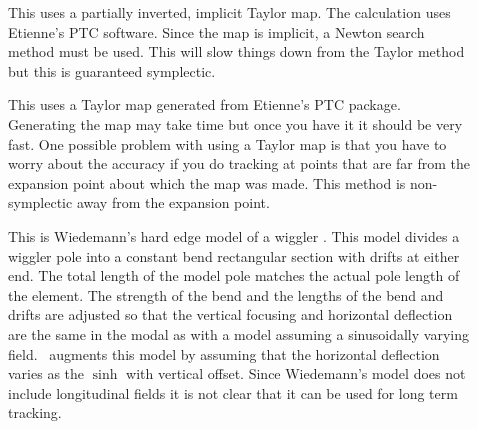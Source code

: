 \begin{description}
\item[]
This uses a partially inverted, implicit Taylor map. The calculation
uses Etienne's PTC software.  Since the map is implicit, a Newton
search method must be used. This will slow things down from the Taylor
method but this is guaranteed symplectic.

\item[]
This uses a Taylor map generated from Etienne's PTC
package. Generating the map may take time but once you have it it
should be very fast. One possible problem with using a Taylor map is
that you have to worry about the accuracy if you do tracking at points
that are far from the expansion point about which the map was
made. This method is non-symplectic away from the expansion point. 

\item[]
This is Wiedemann's hard edge model of a wiggler
\cite{wiedemann}. This model divides a wiggler pole into a constant 
bend rectangular section with drifts at either end. The total length
of the model pole matches the actual pole length of the element. The
strength of the bend and the lengths of the bend and drifts are
adjusted so that the vertical focusing and horizontal deflection are
the same in the modal as with a model assuming a sinusoidally varying
field. \bmad\ augments this model by assuming that the horizontal
deflection varies as the $\sinh$ with vertical offset.  Since
Wiedemann's model does not include longitudinal fields it is not clear
that it can be used for long term tracking.

\end{description}

\vfill \break
{\vfill}

